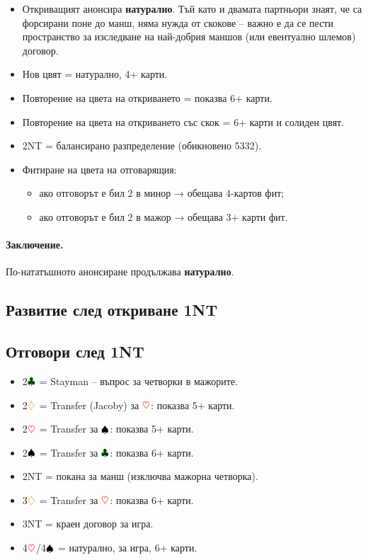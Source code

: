 \documentclass[10pt,a5paper]{extarticle}
\newcommand{\Rheart}{\textcolor{red}{\heartsuit}}
\newcommand{\Rdiamond}{\textcolor{orange}{\diamondsuit}}
\newcommand{\Bspade}{\textcolor{black}{\spadesuit}}
\newcommand{\Bclub}{\textcolor{darkgreen}{\clubsuit}}
\begin{document}
\begin{itemize}
    \item[] Откриващият анонсира \textbf{натурално}.  
        Тъй като и двамата партньори знаят, че са форсирани поне до манш, няма нужда от скокове – важно е да се пести пространство за изследване на най-добрия маншов (или евентуално шлемов) договор.
    \item[] Нов цвят = натурално, 4+ карти.
    \item[] Повторение на цвета на откриването = показва 6+ карти.
    \item[] Повторение на цвета на откриването със скок = 6+ карти и солиден цвят.
    \item[] 2NT = балансирано разпределение (обикновено 5332).
    \item[] Фитиране на цвета на отговарящия:
        \begin{itemize}
            \item[] ако отговорът е бил 2 в минор → обещава 4-картов фит;
            \item[] ако отговорът е бил 2 в мажор → обещава 3+ карти фит.
        \end{itemize}
\end{itemize}

\paragraph{Заключение.}  
По-нататъшното анонсиране продължава \textbf{натурално}.


\subsection*{Развитие след откриване 1NT}

\subsection*{Отговори след 1NT}
\begin{itemize}
    \item[] 2$\Bclub$ = Stayman – въпрос за четворки в мажорите.
    \item[] 2$\Rdiamond$ = Transfer (Jacoby) за $\Rheart$: показва 5+ карти.
    \item[] 2$\Rheart$ = Transfer за $\Bspade$: показва 5+ карти.
    \item[] 2$\Bspade$ = Transfer за $\Bclub$: показва 6+ карти.
    \item[] 2NT = покана за манш (изключва мажорна четворка).
    \item[] 3$\Rdiamond$ = Transfer за $\Rheart$: показва 6+ карти.
    \item[] 3NT = краен договор за игра.
    \item[] 4$\Rheart$/4$\Bspade$ = натурално, за игра, 6+ карти.
\end{itemize}
\end{document}
